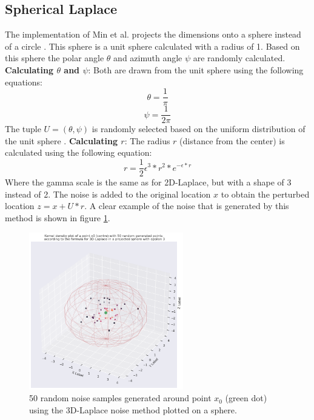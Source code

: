 \subsection{Spherical Laplace}
The implementation of Min et al. projects the dimensions onto a sphere instead of a circle \citep{9646489}.
This sphere is a unit sphere calculated with a radius of 1.
Based on this sphere the polar angle $\theta$ and azimuth angle $\psi$ are randomly calculated. \newline
\textbf{Calculating $\theta$ and $\psi$}: Both are drawn from the unit sphere using the following equations:
\begin{equation}
  \theta = \frac{1}{\pi}
\end{equation}
\begin{equation}
  \psi = \frac{1}{2\pi}
\end{equation}
The tuple $U = (\theta, \psi)$ is randomly selected based on the uniform distribution of the unit sphere \citep{9646489}. \newline
\textbf{Calculating $r$}: The radius $r$ (distance from the center) is calculated using the following equation:
\begin{equation}
  r = \frac{1}{2}\epsilon^3 * r^2 * e^{-\epsilon * r}
  \label{eq:3d-laplace-r}
\end{equation}
Where the gamma scale is the same as for 2D-Laplace, but with a shape of 3 instead of 2.
The noise is added to the original location $x$ to obtain the perturbed location $z = x + U*r$.
A clear example of the noise that is generated by this method is shown in figure \ref{fig:3d-laplace-noise}.
\begin{figure}
  \includegraphics[width=0.6\textwidth]{TheorethicalFramework/ND-Laplace/Images/3d_laplace_noise.png}
  \caption{50 random noise samples generated around point $x_0$ (green dot) using the 3D-Laplace noise method \citep{9646489} plotted on a sphere.}
  \label{fig:3d-laplace-noise}
\end{figure}
